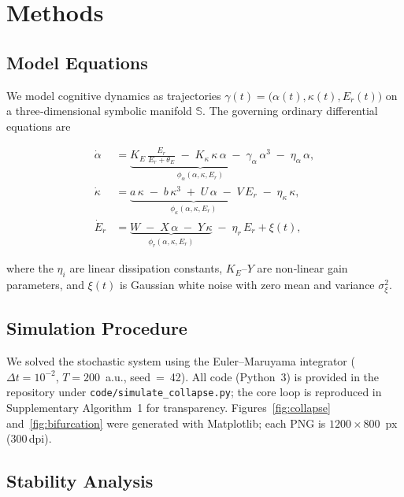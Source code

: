 \section*{Methods}

\subsection*{Model Equations}

We model cognitive dynamics as trajectories $\gamma(t)=\bigl(\alpha(t),\kappa(t),E_{r}(t)\bigr)$ on a three‑dimensional symbolic manifold $\mathbb{S}$.  The governing ordinary differential equations are

\begin{align}
\dot{\alpha} &= \underbrace{K_E\,\frac{E_r}{E_r + \theta_E}\;-\;K_{\kappa}\,\kappa\,\alpha\;-\;\gamma_\alpha\,\alpha^{3}}_{\phi_\alpha(\alpha,\kappa,E_r)}
               \;-\;\eta_\alpha\,\alpha,\\[4pt]
\dot{\kappa} &= \underbrace{a\,\kappa\;-\;b\,\kappa^{3}\;+\;U\,\alpha\;-\;V\,E_r}_{\phi_\kappa(\alpha,\kappa,E_r)}
               \;-\;\eta_\kappa\,\kappa,\\[4pt]
\dot{E}_{r} &= \underbrace{W\;-\;X\,\alpha\;-\;Y\,\kappa}_{\phi_r(\alpha,\kappa,E_r)}
               \;-\;\eta_r\,E_r + \xi(t),
\end{align}

where the $\eta_i$ are linear dissipation constants, $K_E$–$Y$ are non‑linear gain parameters, and $\xi(t)$ is Gaussian white noise with zero mean and variance $\sigma_\xi^{2}$.

\subsection*{Simulation Procedure}

We solved the stochastic system using the Euler–Maruyama integrator ($\Delta t=10^{-2}$, $T=200$ a.u., seed = 42).  
All code (Python 3) is provided in the repository under \texttt{code/simulate\_collapse.py}; the core loop is reproduced in Supplementary Algorithm 1 for transparency.  
Figures \ref{fig:collapse} and \ref{fig:bifurcation} were generated with Matplotlib; each PNG is $1200\times800$ px (300 dpi).

\subsection*{Stability Analysis}

